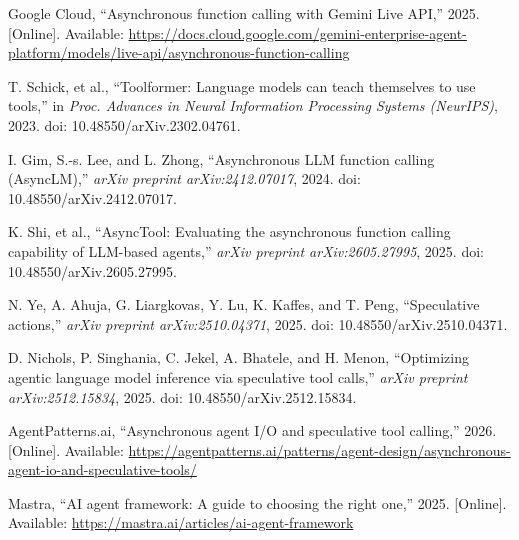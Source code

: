 \documentclass[numbered,mediumone,traditional]{oup-authoring-template}
\begin{document}
\begin{list}{}{%
  \setlength{\labelwidth}{2.6em}%
  \setlength{\labelsep}{0.5em}%
  \setlength{\leftmargin}{3.1em}%
  \setlength{\itemindent}{0pt}%
  \setlength{\topsep}{4pt}%
  \setlength{\itemsep}{2pt}}
\item[{[9]}] Google Cloud, ``Asynchronous function calling with Gemini Live API,'' 2025. [Online]. Available: \url{https://docs.cloud.google.com/gemini-enterprise-agent-platform/models/live-api/asynchronous-function-calling}

\item[{[10]}] T. Schick, et al., ``Toolformer: Language models can teach themselves to use tools,'' in \textit{Proc. Advances in Neural Information Processing Systems (NeurIPS)}, 2023. doi: 10.48550/arXiv.2302.04761.

\item[{[11]}] I. Gim, S.-s. Lee, and L. Zhong, ``Asynchronous LLM function calling (AsyncLM),'' \textit{arXiv preprint arXiv:2412.07017}, 2024. doi: 10.48550/arXiv.2412.07017.

\item[{[12]}] K. Shi, et al., ``AsyncTool: Evaluating the asynchronous function calling capability of LLM-based agents,'' \textit{arXiv preprint arXiv:2605.27995}, 2025. doi: 10.48550/arXiv.2605.27995.

\item[{[13]}] N. Ye, A. Ahuja, G. Liargkovas, Y. Lu, K. Kaffes, and T. Peng, ``Speculative actions,'' \textit{arXiv preprint arXiv:2510.04371}, 2025. doi: 10.48550/arXiv.2510.04371.

\item[{[14]}] D. Nichols, P. Singhania, C. Jekel, A. Bhatele, and H. Menon, ``Optimizing agentic language model inference via speculative tool calls,'' \textit{arXiv preprint arXiv:2512.15834}, 2025. doi: 10.48550/arXiv.2512.15834.

\item[{[15]}] AgentPatterns.ai, ``Asynchronous agent I/O and speculative tool calling,'' 2026. [Online]. Available: \url{https://agentpatterns.ai/patterns/agent-design/asynchronous-agent-io-and-speculative-tools/}

\item[{[16]}] Mastra, ``AI agent framework: A guide to choosing the right one,'' 2025. [Online]. Available: \url{https://mastra.ai/articles/ai-agent-framework}

\end{list}
\endgroup
\end{document}
